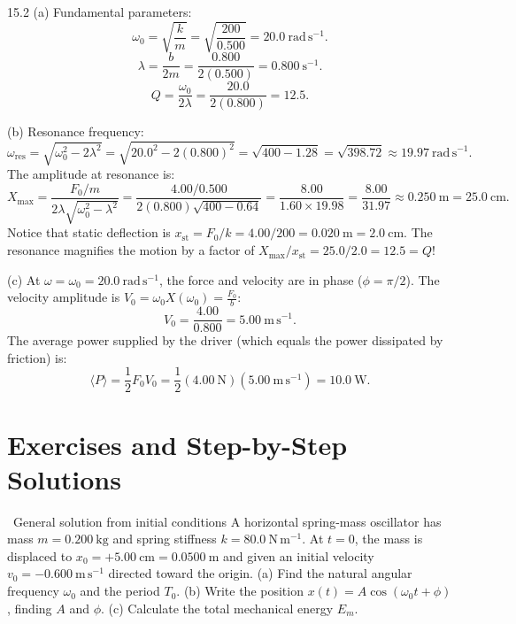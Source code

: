 \begin{solution}{15.2}
(a) Fundamental parameters:
\[
\omega_0 = \sqrt{\frac{k}{m}} = \sqrt{\frac{200}{0.500}} = \mathbf{20.0\ \mathrm{rad\,s^{-1}}.}
\]
\[
\lambda = \frac{b}{2m} = \frac{0.800}{2(0.500)} = \mathbf{0.800\ \mathrm{s^{-1}}.}
\]
\[
Q = \frac{\omega_0}{2\lambda} = \frac{20.0}{2(0.800)} = \mathbf{12.5.}
\]

(b) Resonance frequency:
\[
\omega_{\text{res}} = \sqrt{\omega_0^2 - 2\lambda^2} = \sqrt{20.0^2 - 2(0.800)^2} = \sqrt{400 - 1.28} = \sqrt{398.72} \approx \mathbf{19.97\ \mathrm{rad\,s^{-1}}.}
\]
The amplitude at resonance is:
\[
X_{\max} = \frac{F_0/m}{2\lambda\sqrt{\omega_0^2 - \lambda^2}} = \frac{4.00/0.500}{2(0.800)\sqrt{400 - 0.64}} = \frac{8.00}{1.60\times 19.98} = \frac{8.00}{31.97} \approx \mathbf{0.250\ \mathrm{m}} = 25.0\ \mathrm{cm}.
\]
Notice that static deflection is $x_{\text{st}} = F_0/k = 4.00/200 = 0.020\ \mathrm{m} = 2.0\ \mathrm{cm}$. The resonance magnifies the motion by a factor of $X_{\max}/x_{\text{st}} = 25.0/2.0 = 12.5 = Q$!

(c) At $\omega = \omega_0 = 20.0\ \mathrm{rad\,s^{-1}}$, the force and velocity are in phase ($\phi = \pi/2$). The velocity amplitude is $V_0 = \omega_0 X(\omega_0) = \frac{F_0}{b}$:
\[
V_0 = \frac{4.00}{0.800} = 5.00\ \mathrm{m\,s^{-1}}.
\]
The average power supplied by the driver (which equals the power dissipated by friction) is:
\[
\langle P \rangle = \frac{1}{2}F_0 V_0 = \frac{1}{2}(4.00\ \mathrm{N})(5.00\ \mathrm{m\,s^{-1}}) = \mathbf{10.0\ \mathrm{W}.}
\]
\end{solution}

\section{Exercises and Step-by-Step Solutions}

\begin{exercise}{\warm\ General solution from initial conditions}
A horizontal spring-mass oscillator has mass $m=0.200\ \mathrm{kg}$ and spring stiffness $k=80.0\ \mathrm{N\,m^{-1}}$. At $t=0$, the mass is displaced to $x_0 = +5.00\ \mathrm{cm} = 0.0500\ \mathrm{m}$ and given an initial velocity $v_0 = -0.600\ \mathrm{m\,s^{-1}}$ directed toward the origin.
(a) Find the natural angular frequency $\omega_0$ and the period $T_0$.
(b) Write the position $x(t) = A\cos(\omega_0 t + \phi)$, finding $A$ and $\phi$.
(c) Calculate the total mechanical energy $E_m$.
\end{exercise}

